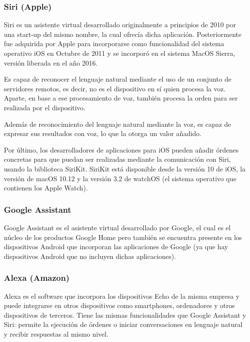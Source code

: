 \documentclass[spanish,12pt, a4paper, twoside]{paper}
\begin{document}
\subsubsection{Siri (Apple)}

Siri es un asistente virtual desarrollado originalmente a principios de 2010 por una start-up del mismo nombre, la cual ofrecía dicha aplicación. Posteriormente fue adquirida por Apple para incorporarse como funcionalidad del sistema operativo iOS en Octubre de 2011 y se incorporó en el sistema MacOS Sierra, versión liberada en el año 2016.
\newline

Es capaz de reconocer el lenguaje natural mediante el uso de un conjunto de servidores remotos, es decir, no es el dispositivo en sí quien procesa la voz. Aparte, en base a ese procesamiento de voz, también procesa la orden para ser realizada por el dispositivo.
\newline

Además de reconocimiento del lenguaje natural mediante la voz, es capaz de expresar sus resultados con voz, lo que la otorga un valor añadido.
\newline

Por último, los desarrolladores de aplicaciones para iOS pueden añadir órdenes concretas para que puedan ser realizadas mediante la comunicación con Siri, usando la biblioteca SiriKit. SiriKit está disponible desde la versión 10 de iOS, la versión de macOS 10.12 y la versión 3.2 de watchOS (el sistema operativo que contienen los Apple Watch).

\subsubsection{Google Assistant}

Google Assistant es el asistente virtual desarrollado por Google, el cual es el núcleo de los productos Google Home pero también se encuentra presente en los dispositivos Android que incorporan las aplicaciones de Google (ya que hay dispositivos Android que no incluyen dichas aplicaciones).

\subsubsection{Alexa (Amazon)}

Alexa es el software que incorpora los dispositivos Echo de la misma empresa y puede integrarse en otros dispositivos como smartphones, ordenadores y otros dispositivos de terceros. Tiene las mismas funcionalidades que Google Assistant y Siri: permite la ejecución de órdenes o iniciar conversaciones en lenguaje natural y recibir respuestas al mismo nivel.
\end{document}
